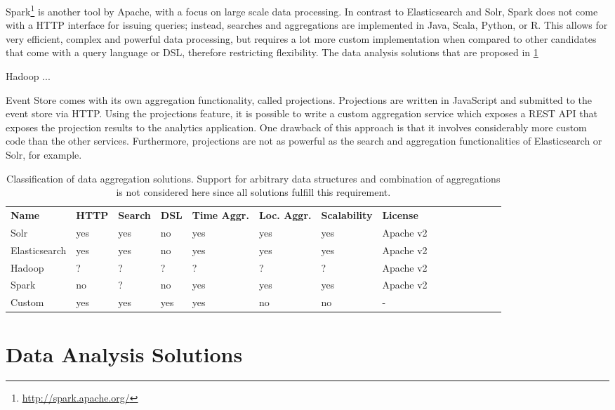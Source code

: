 
Spark\footnote{\url{http://spark.apache.org/}} is another tool by Apache, with a focus on large scale data processing.
In contrast to Elasticsearch and Solr, Spark does not come with a HTTP interface for issuing queries; instead, searches and aggregations are implemented in Java, Scala, Python, or R.
This allows for very efficient, complex and powerful data processing, but requires a lot more custom implementation when compared to other candidates that come with a query language or \ac{DSL}, therefore restricting flexibility.
The data analysis solutions that are proposed in \cref{sec:classifications:analysis} 

Hadoop ...

Event Store comes with its own aggregation functionality, called projections.
Projections are written in JavaScript and submitted to the event store via HTTP.
Using the projections feature, it is possible to write a custom aggregation service which exposes a \ac{REST} API that exposes the projection results to the analytics application.
One drawback of this approach is that it involves considerably more custom code than the other services.
Furthermore, projections are not as powerful as the search and aggregation functionalities of Elasticsearch or Solr, for example.

\begin{table}[]
\centering
\caption{Classification of data aggregation solutions. Support for arbitrary data structures and combination of aggregations is not considered here since all solutions fulfill this requirement.}
\begin{tabular}{lllllllllllllll}
\textbf{Name} & \textbf{HTTP} & \textbf{Search} & \textbf{DSL} & \textbf{Time Aggr.} & \textbf{Loc. Aggr.} & \textbf{Scalability} & \textbf{License} \\
Solr & yes & yes & no & yes & yes & yes & Apache v2 \\
Elasticsearch & yes & yes & no & yes & yes & yes & Apache v2 \\
Hadoop & ? & ? & ? & ? & ? & ? & Apache v2 \\
Spark & no & ? & no & yes & yes & yes & Apache v2 \\
Custom & yes & yes & yes & yes & no & no & -
\end{tabular}
\label{table:classifications:aggregation}
\end{table}

\section{Data Analysis Solutions}
\label{sec:classifications:analysis}

